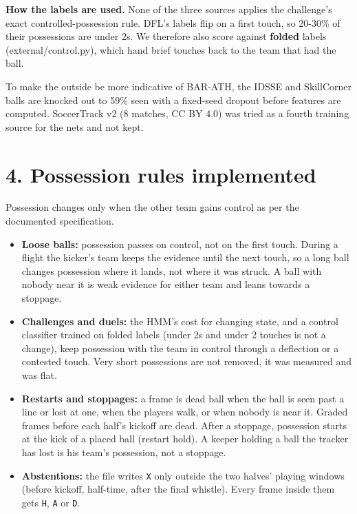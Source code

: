 \documentclass[11pt,a4paper]{article}
\newcommand{\code}[1]{\texttt{#1}}
\begin{document}
\textbf{How the labels are used.} None of the three sources applies the challenge's exact controlled-possession rule. DFL's labels flip on a first touch, so 20-30\% of their possessions are under 2s. We therefore also score against \textbf{folded} labels (external/control.py), which hand brief touches back to the team that had the ball.

To make the outside be more indicative of BAR-ATH, the IDSSE and SkillCorner balls are knocked out to 59\% seen with a fixed-seed dropout before features are computed. SoccerTrack v2 (8 matches, CC BY 4.0) was tried as a fourth training source for the nets and not kept.

\section{4. Possession rules implemented}

Possession changes only when the other team gains control as per the documented specification.
\begin{itemize}
  \item \textbf{Loose balls:} possession passes on control, not on the first touch. During a flight the kicker's team keeps the evidence until the next touch, so a long ball changes possession where it lands, not where it was struck. A ball with nobody near it is weak evidence for either team and leans towards a stoppage.
  \item \textbf{Challenges and duels:} the HMM's cost for changing state, and a control classifier trained on folded labels (under 2s and under 2 touches is not a change), keep possession with the team in control through a deflection or a contested touch. Very short possessions are not removed, it was measured and was flat.
  \item \textbf{Restarts and stoppages:} a frame is dead ball when the ball is seen past a line or lost at one, when the players walk, or when nobody is near it. Graded frames before each half's kickoff are dead. After a stoppage, possession starts at the kick of a placed ball (restart hold). A keeper holding a ball the tracker has lost is his team's possession, not a stoppage.
  \item \textbf{Abstentions:} the file writes \code{X} only outside the two halves' playing windows (before kickoff, half-time, after the final whistle). Every frame inside them gets \code{H}, \code{A} or \code{D}.
\end{itemize}
\end{document}
